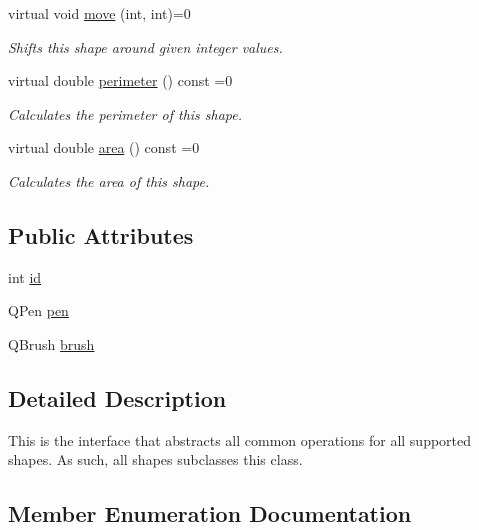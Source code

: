 \begin{DoxyCompactItemize}
virtual void \mbox{\hyperlink{class_i_shape_a3d23494cd34e658cc6b39a2e2db0b7fe}{move}} (int, int)=0
\begin{DoxyCompactList}\small\item\em Shifts this shape around given integer values. \end{DoxyCompactList}\item 
virtual double \mbox{\hyperlink{class_i_shape_a485f6770c4e56b31c76d368b959b6f00}{perimeter}} () const =0
\begin{DoxyCompactList}\small\item\em Calculates the perimeter of this shape. \end{DoxyCompactList}\item 
virtual double \mbox{\hyperlink{class_i_shape_aed742a160acdd13c9cfdeb16e605afea}{area}} () const =0
\begin{DoxyCompactList}\small\item\em Calculates the area of this shape. \end{DoxyCompactList}\end{DoxyCompactItemize}
\subsection*{Public Attributes}
\begin{DoxyCompactItemize}
\item 
int \mbox{\hyperlink{class_i_shape_a6ff2d631831c1079b88eeebc8ac65bb0}{id}}
\item 
Q\+Pen \mbox{\hyperlink{class_i_shape_ab185a01c9703b4db801b54030031a9c6}{pen}}
\item 
Q\+Brush \mbox{\hyperlink{class_i_shape_a3827e9f0c3c88331ceaa3bb9b00f7073}{brush}}
\end{DoxyCompactItemize}


\subsection{Detailed Description}
This is the interface that abstracts all common operations for all supported shapes. As such, all shapes subclasses this class. 



\subsection{Member Enumeration Documentation}
\mbox{\label{class_i_shape_a8f50993477b5ddb44c0547ef3d547cdc}} 
